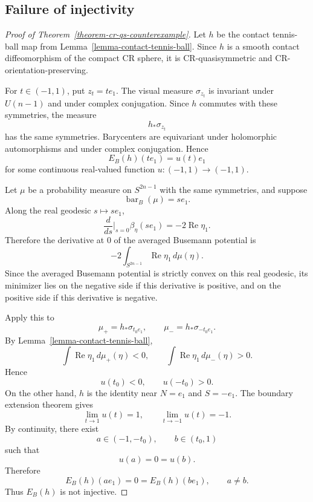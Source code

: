 \documentclass[11pt]{article}
\theoremstyle{definition}
\theoremstyle{remark}
\theoremstyle{definition}
\newcommand{\barB}{\operatorname{bar}_{B}}
\begin{document}
\subsection{Failure of injectivity}

\begin{proof}[Proof of Theorem~\ref{theorem-cr-qs-counterexample}]

Let \(h\) be the contact tennis-ball map from
Lemma~\ref{lemma-contact-tennis-ball}.  Since \(h\) is a smooth contact
diffeomorphism of the compact CR sphere, it is CR-quasisymmetric and
CR-orientation-preserving.

For \(t\in(-1,1)\), put \(z_t=te_1\).  The visual measure \(\sigma_{z_t}\) is
invariant under \(U(n-1)\) and under complex conjugation.  Since \(h\) commutes
with these symmetries, the measure
\[
        h_*\sigma_{z_t}
\]
has the same symmetries.  Barycenters are equivariant under holomorphic
automorphisms and under complex conjugation.  Hence
\[
        E_B(h)(te_1)=u(t)e_1
\]
for some continuous real-valued function \(u:(-1,1)\to(-1,1)\).

Let \(\mu\) be a probability measure on \(S^{2n-1}\) with the same symmetries,
and suppose
\[
        \barB(\mu)=se_1.
\]
Along the real geodesic \(s\mapsto se_1\),
\[
        \frac{d}{ds}\bigg|_{s=0}\beta_\eta(se_1)
        =
        -2\operatorname{Re}\eta_1.
\]
Therefore the derivative at \(0\) of the averaged Busemann potential is
\[
        -2\int_{S^{2n-1}}\operatorname{Re}\eta_1\,d\mu(\eta).
\]
Since the averaged Busemann potential is strictly convex on this real geodesic,
its minimizer lies on the negative side if this derivative is positive, and on
the positive side if this derivative is negative.

Apply this to
\[
        \mu_+=h_*\sigma_{t_0e_1},
        \qquad
        \mu_-=h_*\sigma_{-t_0e_1}.
\]
By Lemma~\ref{lemma-contact-tennis-ball},
\[
        \int \operatorname{Re}\eta_1\,d\mu_+(\eta)<0,
        \qquad
        \int \operatorname{Re}\eta_1\,d\mu_-(\eta)>0.
\]
Hence
\[
        u(t_0)<0,
        \qquad
        u(-t_0)>0.
\]
On the other hand, \(h\) is the identity near \(N=e_1\) and \(S=-e_1\).  The
boundary extension theorem gives
\[
        \lim_{t\to1}u(t)=1,
        \qquad
        \lim_{t\to-1}u(t)=-1.
\]
By continuity, there exist
\[
        a\in(-1,-t_0),
        \qquad
        b\in(t_0,1)
\]
such that
\[
        u(a)=0=u(b).
\]
Therefore
\[
        E_B(h)(ae_1)=0=E_B(h)(be_1),
        \qquad a\ne b.
\]
Thus \(E_B(h)\) is not injective.
\end{proof}
\end{document}
